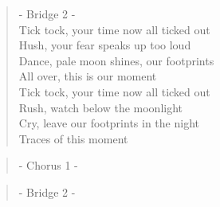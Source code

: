 \begin{verse}
- Bridge 2 -\\
Tick tock, your time now all ticked out\\
Hush, your fear speaks up too loud\\
Dance, pale moon shines, our footprints \\
All over, this is our moment\\ 
Tick tock, your time now all ticked out \\
Rush, watch below the moonlight \\
Cry, leave our footprints in the night \\
Traces of this moment
\end{verse}

\begin{verse}
- Chorus 1 -
\end{verse}

\begin{verse}
- Bridge 2 -
\end{verse}
\clearpage

